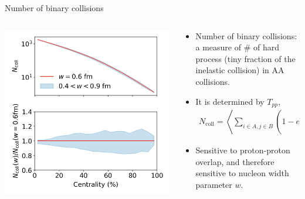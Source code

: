 \documentclass[11pt, aspectratio=169]{beamer}
\begin{document}
\begin{frame}{Number of binary collisions}
\begin{columns}
\begin{column}{.4\textwidth}
\includegraphics[width=\textwidth]{ncoll.png}
\end{column}
\begin{column}{.6\textwidth}
\begin{itemize}
\item Number of binary collisions: a measure of \# of hard process (tiny fraction of the inelastic collision) in AA collisions.
\item It is determined by $T_{pp}$,
\begin{eqnarray}
\nonumber
N_{\textrm{coll}} = \left\langle \sum_{i\in A, j\in B} 
\left(1-e^{
-\frac{1}{4\pi}f\left(\frac{\sigma_{NN}}{w^2}\right)e^{-\frac{b_{ij}^2}{4w^2}}
}\right)
\right\rangle
\end{eqnarray}
\item Sensitive to proton-proton overlap, and therefore sensitive to nucleon width parameter $w$.
\end{itemize}
\end{column}
\end{columns}
\end{frame}
\end{document}
